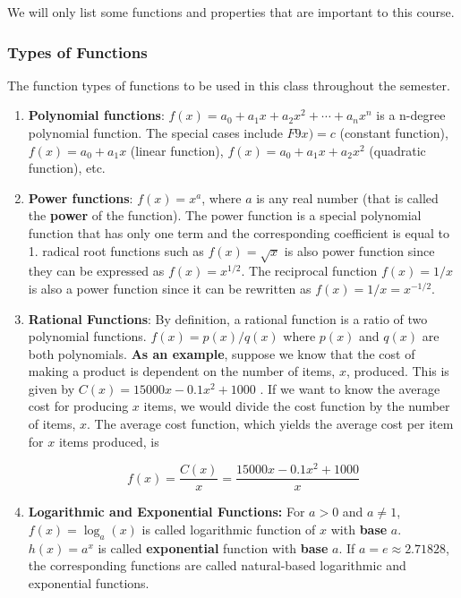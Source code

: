 \documentclass[
]{book}
\begin{document}
We will only list some functions and properties that are important to this course.

\hypertarget{types-of-functions}{%
\subsubsection{Types of Functions}\label{types-of-functions}}

The function types of functions to be used in this class throughout the semester.

\begin{enumerate}
\def\labelenumi{\arabic{enumi}.}
\item
  \textbf{Polynomial functions}: \(f(x) = a_0 + a_1x + a_2x^2 + \cdots + a_nx^n\) is a n-degree polynomial function. The special cases include \(F9x) = c\) (constant function), \(f(x) = a_0 + a_1x\) (linear function), \(f(x) = a_0 + a_1x + a_2x^2\) (quadratic function), etc.
\item
  \textbf{Power functions}: \(f(x) = x^a\), where \(a\) is any real number (that is called the \textbf{power} of the function). The power function is a special polynomial function that has only one term and the corresponding coefficient is equal to 1. radical root functions such as \(f(x) = \sqrt{x}\) is also power function since they can be expressed as \(f(x) = x^{1/2}\). The reciprocal function \(f(x) = 1/x\) is also a power function since it can be rewritten as \(f(x) = 1/x = x^{-1/2}\).
\item
  \textbf{Rational Functions}: By definition, a rational function is a ratio of two polynomial functions. \(f(x) = p(x)/q(x)\) where \(p(x)\) and \(q(x)\) are both polynomials. \textbf{As an example}, suppose we know that the cost of making a product is dependent on the number of items, \(x\), produced. This is given by \(C(x) = 15000x - 0.1x^2 + 1000\) . If we want to know the average cost for producing \(x\) items, we would divide the cost function by the number of items, \(x\). The average cost function, which yields the average cost per item for \(x\) items produced, is

  \[f(x) = \frac{C(x)}{x} = \frac{15000x - 0.1x^2 + 1000}{x}\]
\item
  \textbf{Logarithmic and Exponential Functions:} For \(a > 0\) and \(a \ne 1\), \(f(x) = \log_a(x)\) is called logarithmic function of \(x\) with \textbf{base} \(a\). \(h(x) = a^x\) is called \textbf{exponential} function with \textbf{base} \(a\). If \(a = e \approx 2.71828\), the corresponding functions are called natural-based logarithmic and exponential functions.
\end{enumerate}
\end{document}
